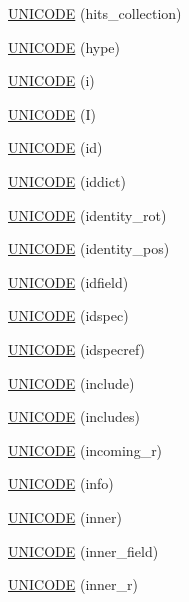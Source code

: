 \begin{DoxyCompactItemize}
\hyperlink{namespace_d_d4hep_1_1_x_m_l_a8aebb8c1d57f39f6f77ad9a201eda8bf}{U\+N\+I\+C\+O\+DE} (hits\+\_\+collection)
\item 
\hyperlink{namespace_d_d4hep_1_1_x_m_l_ae0e09e0e6c91d6db87d4a4425ee29979}{U\+N\+I\+C\+O\+DE} (hype)
\item 
\hyperlink{namespace_d_d4hep_1_1_x_m_l_a8a18515568e38a4d7fcce6dde96afc60}{U\+N\+I\+C\+O\+DE} (i)
\item 
\hyperlink{namespace_d_d4hep_1_1_x_m_l_a4a2b53c30fc46f6c678164c84e5fe971}{U\+N\+I\+C\+O\+DE} (I)
\item 
\hyperlink{namespace_d_d4hep_1_1_x_m_l_a04057694ceabef8f268fa221c04f7b01}{U\+N\+I\+C\+O\+DE} (id)
\item 
\hyperlink{namespace_d_d4hep_1_1_x_m_l_afc478bc85e421d1b40bdffe4b0c2962d}{U\+N\+I\+C\+O\+DE} (iddict)
\item 
\hyperlink{namespace_d_d4hep_1_1_x_m_l_aa0d82439cb124dc88a08a2d1bbe4e7b2}{U\+N\+I\+C\+O\+DE} (identity\+\_\+rot)
\item 
\hyperlink{namespace_d_d4hep_1_1_x_m_l_abe0ea758871a8a326da3ec46761cb5d5}{U\+N\+I\+C\+O\+DE} (identity\+\_\+pos)
\item 
\hyperlink{namespace_d_d4hep_1_1_x_m_l_a322a908d2d64b76ba8c3fca928008e94}{U\+N\+I\+C\+O\+DE} (idfield)
\item 
\hyperlink{namespace_d_d4hep_1_1_x_m_l_a153be9698d96d7be3a2d022a5c89c534}{U\+N\+I\+C\+O\+DE} (idspec)
\item 
\hyperlink{namespace_d_d4hep_1_1_x_m_l_a5fee26a2eb466ec9d2000aa9622db880}{U\+N\+I\+C\+O\+DE} (idspecref)
\item 
\hyperlink{namespace_d_d4hep_1_1_x_m_l_a7eb13b46fe76d221055f8b22c04d62b0}{U\+N\+I\+C\+O\+DE} (include)
\item 
\hyperlink{namespace_d_d4hep_1_1_x_m_l_a16348e2302a113086ac0368d41ce7de7}{U\+N\+I\+C\+O\+DE} (includes)
\item 
\hyperlink{namespace_d_d4hep_1_1_x_m_l_a7f9a4abb0ea78ba6c906b4e01ab20f96}{U\+N\+I\+C\+O\+DE} (incoming\+\_\+r)
\item 
\hyperlink{namespace_d_d4hep_1_1_x_m_l_a121d723b2df3a5154cae8f29fcbdef18}{U\+N\+I\+C\+O\+DE} (info)
\item 
\hyperlink{namespace_d_d4hep_1_1_x_m_l_a493fc42470b4fe63c1af04c9dc58823c}{U\+N\+I\+C\+O\+DE} (inner)
\item 
\hyperlink{namespace_d_d4hep_1_1_x_m_l_a03f277eadaca1de64988b99a7c69560a}{U\+N\+I\+C\+O\+DE} (inner\+\_\+field)
\item 
\hyperlink{namespace_d_d4hep_1_1_x_m_l_a8d82a8a4d288d870a5fa27fd3190182c}{U\+N\+I\+C\+O\+DE} (inner\+\_\+r)

\end{DoxyCompactItemize}
